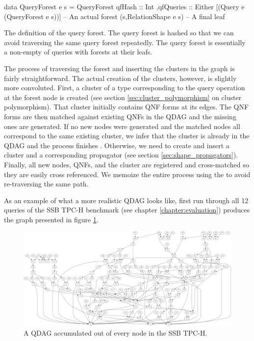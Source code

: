 \begin{code}
  \begin{haskellcode}
    data QueryForest e s =
      QueryForest
      { qfHash :: Int
        ,qfQueries
          :: Either 
            [(Query e (QueryForest e s))] -- An actual forest
            (s,RelationShape e s) -- A final leaf
      }
  \end{haskellcode}

  \caption{\label{lst:query_forest}The definition of the query forest. The
    query forest is hashed so that we can avoid traversing the same
    query forest repeatedly. The query forest is essentially a
    non-empty of queries with forests at their leafs.}
\end{code}

The process of traversing the forest and inserting the clusters in the
graph is fairly straightforward. The actual creation of the clusters,
however, is slightly more convoluted. First, a cluster of a type
corresponding to the query operation at the forest node is created
(see section \ref{sec:cluster_polymorphism} on cluster
polymorphism). That cluster initially contains QNF forms at its
edges. The QNF forms are then matched against existing QNFs in the
QDAG and the missing ones are generated. If no new nodes were
generated and the matched nodes all correspond to the same existing
cluster, we infer that the cluster is already in the QDAG and the
process finishes . Otherwise, we need to create and insert a cluster
and a corresponding propagator (see section
\ref{sec:shape_propagators}). Finally, all new nodes, QNFs, and the
cluster are registered and cross-matched so they are easily cross
referenced.  We memoize the entire process using the  to
avoid re-traversing the same path.

As an example of what a more realistic QDAG looks like, first run
through all 12 queries of the SSB TPC-H benchmark (see chapter
\ref{chapter:evaluation}) produces the graph presented in figure
\ref{fig:ssb_graph}.

\begin{figure}[H]
  \centering
  \includegraphics[width=\textwidth]{./imgs/ssb_graph.pdf}
  \caption{\label{fig:ssb_graph}A QDAG accumulated out of every node
    in the SSB TPC-H.}
\end{figure}

